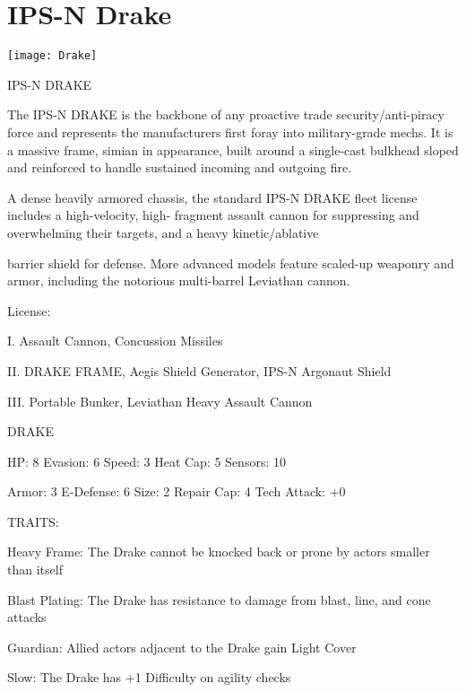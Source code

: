 \section{IPS-N Drake}

\centering\texttt{[image: Drake]}


                                                    IPS-N DRAKE

The IPS-N DRAKE is the backbone of any proactive trade security/anti-piracy force and represents the
manufacturers first foray into military-grade mechs. It is a massive frame, simian in appearance, built
around a single-cast bulkhead sloped and reinforced to handle sustained incoming and outgoing fire.

A dense heavily armored chassis, the standard IPS-N DRAKE fleet license includes a high-velocity, high-
fragment assault cannon for suppressing and overwhelming their targets, and a heavy kinetic/ablative

barrier shield for defense. More advanced models feature scaled-up weaponry and armor, including the
notorious multi-barrel Leviathan cannon.




                                                     License:

I. Assault Cannon, Concussion Missiles

II. DRAKE FRAME, Aegis Shield Generator, IPS-N Argonaut Shield

III. Portable Bunker, Leviathan Heavy Assault Cannon


                                                     DRAKE

  HP: 8           Evasion: 6                             Speed: 3            Heat Cap: 5        Sensors: 10

  Armor: 3        E-Defense: 6                           Size: 2             Repair Cap: 4      Tech Attack:
                                                                                                +0

                                                     TRAITS:

  Heavy Frame: The Drake cannot be knocked back or prone by actors smaller than itself

  Blast Plating: The Drake has resistance to damage from blast, line, and cone attacks

  Guardian: Allied actors adjacent to the Drake gain Light Cover

  Slow: The Drake has +1 Difficulty on agility checks

